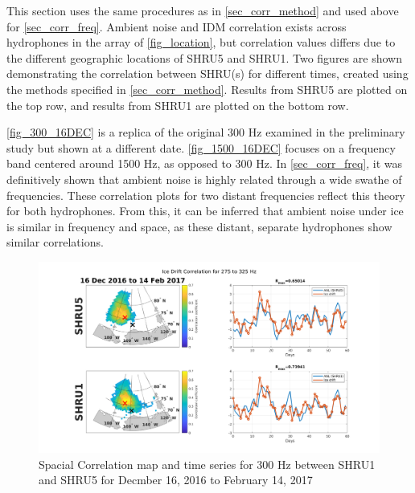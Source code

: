 This section uses the same procedures as in \autoref{sec_corr_method} and used above for \autoref{sec_corr_freq}. Ambient noise and IDM correlation exists across hydrophones in the array of \autoref{fig_location}, but correlation values differs due to the different geographic locations of SHRU5 and SHRU1. Two figures are shown demonstrating the correlation between SHRU(s) for different times, created using the methods specified in \autoref{sec_corr_method}. Results from SHRU5 are plotted on the top row, and results from SHRU1 are plotted on the bottom row. 

\autoref{fig_300_16DEC} is a replica of the original 300 Hz examined in the preliminary study \parencite{Bonnel2021} but shown at a different date. \autoref{fig_1500_16DEC} focuses on a frequency band centered around 1500 Hz, as opposed to 300 Hz. In \autoref{sec_corr_freq}, it was definitively shown that ambient noise is highly related through a wide swathe of frequencies. These correlation plots for two distant frequencies reflect this theory for both hydrophones. From this, it can be inferred that ambient noise under ice is similar in frequency and space, as these distant, separate hydrophones show similar correlations.   %

\begin{figure}[p]
\centering
\includegraphics[scale=0.35]{Figures/300_spatial_corr_20161216-20170214_275_325.png}
\caption{Spacial Correlation map and time series for 300 Hz between SHRU1 and SHRU5 for Decmber 16, 2016 to February 14, 2017}
\label{fig_300_16DEC}
\end{figure}

